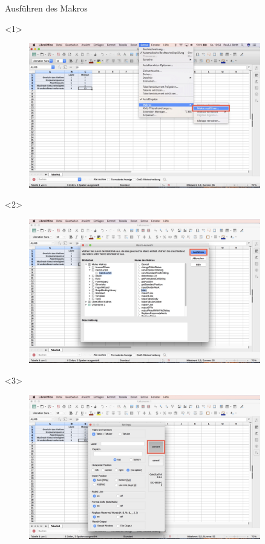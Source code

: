 \documentclass["WS\space 16-17\space -\space LaTeX-Kurs\space -\space Praesentation\space -\space 2.tex"]{subfiles}
\begin{document}
\begin{frame}[c]{Ausführen des Makros}
	\begin{onlyenv}
		\begin{figure}[htbp]
			\centering
			\includegraphics[width=0.9\textwidth]{img/Bildschirmfoto_mitKasten/4_Ausfuhren_Macro/1.jpg}
		\end{figure}
	\end{onlyenv}
	\begin{onlyenv}
		\begin{figure}[htbp]
			\centering
			\includegraphics[width=0.9\textwidth]{img/Bildschirmfoto_mitKasten/4_Ausfuhren_Macro/2.jpg}
		\end{figure}
	\end{onlyenv}
	\begin{onlyenv}
		\begin{figure}[htbp]
			\centering
			\includegraphics[width=0.9\textwidth]{img/Bildschirmfoto_mitKasten/3_Tabelle/6.jpg}

\end{figure}
\end{onlyenv}
\end{frame}
\end{document}
